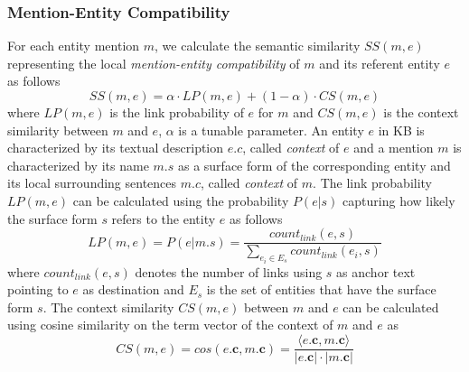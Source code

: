 \subsubsection{Mention-Entity Compatibility}
For each entity mention $m$, we calculate the semantic similarity $SS(m,e)$ representing the local \emph{mention-entity compatibility} of $m$ and its referent entity $e$ as follows
\begin{equation}\label{anno_salient:SS}
SS(m,e)=\alpha\cdot LP(m,e) + (1-\alpha)\cdot CS(m,e)
\end{equation}
where $LP(m,e)$ is the link probability of $e$ for $m$ and $CS(m,e)$ is the context similarity between $m$ and $e$, $\alpha$ is a tunable parameter.
An entity $e$ in KB is characterized by its textual description $e.c$, called \emph{context} of $e$ and a mention $m$ is characterized by its name $m.s$ as a surface form of the corresponding entity and its local surrounding sentences $m.c$, called \emph{context} of $m$.
The link probability $LP(m,e)$ can be calculated using the probability $P(e|s)$ capturing how likely the surface form $s$ refers to the entity $e$ as follows
\begin{equation}\label{anno_salient:LP}
LP(m,e)=P(e|m.s)=\frac{count_{link}(e,s)}{\sum_{e_i\in E_{s}}count_{link}(e_i,s)}
\end{equation}
where $count_{link}(e,s)$ denotes the number of links using $s$ as anchor text pointing to $e$ as destination and $E_{s}$ is the set of entities that have the surface form $s$.
The context similarity $CS(m,e)$ between $m$ and $e$ can be calculated using  cosine similarity on the term vector of the context of $m$ and $e$ as 
\begin{equation}\label{anno_salient:sim}
CS(m,e) =  cos(e.\mathbf {c},m.\mathbf {c}) =
\frac{\langle e.\mathbf {c}, m.\mathbf {c} \rangle}{|e.\mathbf {c}| \cdot |m.\mathbf {c}|}  
\end{equation}



